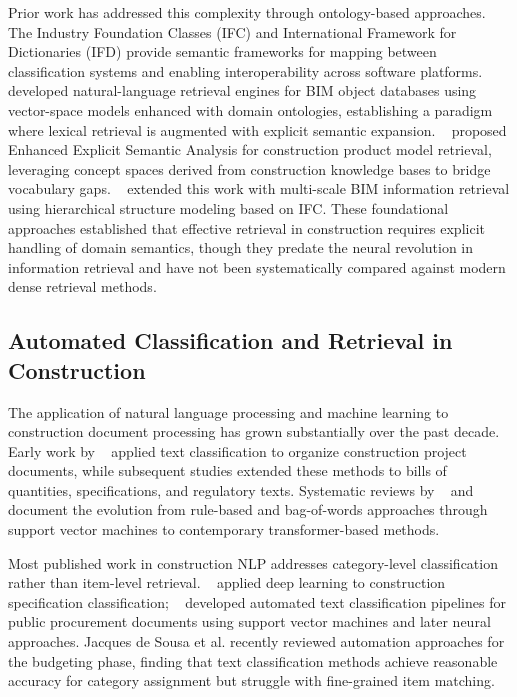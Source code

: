 \documentclass[preprint,12pt]{elsarticle}
\begin{document}
Prior work has addressed this complexity through ontology-based approaches. The Industry Foundation Classes (IFC) and International Framework for Dictionaries (IFD) provide semantic frameworks for mapping between classification systems and enabling interoperability across software platforms. ~\cite{wuNaturallanguagebasedIntelligentRetrieval2019} developed natural-language retrieval engines for BIM object databases using vector-space models enhanced with domain ontologies, establishing a paradigm where lexical retrieval is augmented with explicit semantic expansion. ~\cite{43f8dc68b3d05e73df8185c5a051e207a64e4ed4} proposed Enhanced Explicit Semantic Analysis for construction product model retrieval, leveraging concept spaces derived from construction knowledge bases to bridge vocabulary gaps. ~\cite{wangMultiscaleInformationRetrieval2021} extended this work with multi-scale BIM information retrieval using hierarchical structure modeling based on IFC. These foundational approaches established that effective retrieval in construction requires explicit handling of domain semantics, though they predate the neural revolution in information retrieval and have not been systematically compared against modern dense retrieval methods.

\subsection{Automated Classification and Retrieval in Construction}

The application of natural language processing and machine learning to construction document processing has grown substantially over the past decade. Early work by ~\cite{caldasAutomatingHierarchicalDocument2003} applied text classification to organize construction project documents, while subsequent studies extended these methods to bills of quantities, specifications, and regulatory texts. Systematic reviews by ~\cite{wuNaturalLanguageProcessing2022} and ~\cite{chungComparingNaturalLanguage2023} document the evolution from rule-based and bag-of-words approaches through support vector machines to contemporary transformer-based methods.

Most published work in construction NLP addresses category-level classification rather than item-level retrieval. ~\cite{tangAutomatedConstructionQuantity2022} applied deep learning to construction specification classification; ~\cite{martinez-rojasUsingClassificationTechniques2018} developed automated text classification pipelines for public procurement documents using support vector machines and later neural approaches. Jacques de Sousa et al. recently reviewed automation approaches for the budgeting phase, finding that text classification methods achieve reasonable accuracy for category assignment but struggle with fine-grained item matching.
\end{document}
